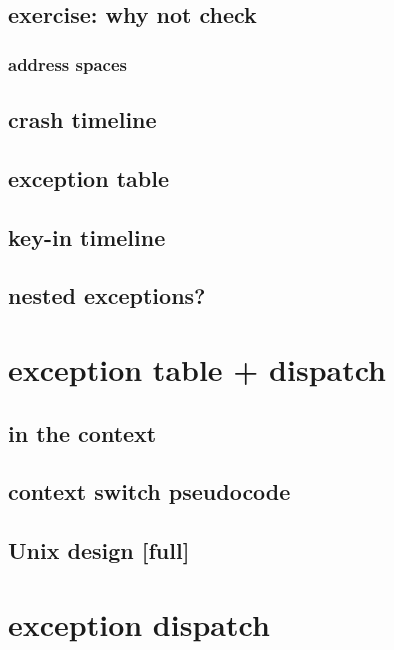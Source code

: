 
\subsection{exercise: why not check}


\subsubsection{address spaces}


\subsection{crash timeline}


\subsection{exception table}


\subsection{key-in timeline}


\subsection{nested exceptions?}


\section{exception table + dispatch}


\subsection{in the context}


\subsection{context switch pseudocode}


\subsection{Unix design [full]}


\section{exception dispatch}


